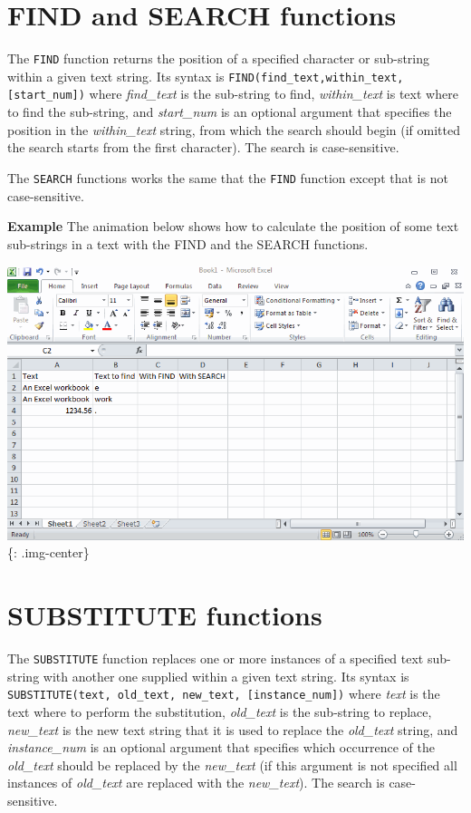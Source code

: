 \section{FIND and SEARCH functions}
\label{findandsearchfunctions}

The \texttt{FIND} function returns the position of a specified character or sub-string within a given text string. Its syntax is \texttt{FIND(find\_text,within\_text,[start\_num])} where \emph{find\_text} is the sub-string to find, \emph{within\_text} is text where to find the sub-string, and \emph{start\_num} is an optional argument that specifies the position in the \emph{within\_text} string, from which the search should begin (if omitted the search starts from the first character). The search is case-sensitive. 

The \texttt{SEARCH} functions works the same that the \texttt{FIND} function except that is not case-sensitive. 

\textbf{Example} The animation below shows how to calculate the position of some text sub-strings in a text with the FIND and the SEARCH functions.

\includegraphics[keepaspectratio,width=\textwidth,height=0.75\textheight]{img/example_function_find_search.gif}
\{: .img-center\}

\section{SUBSTITUTE functions}
\label{substitutefunctions}

The \texttt{SUBSTITUTE} function replaces one or more instances of a specified text sub-string with another one supplied within a given text string. Its syntax is \texttt{SUBSTITUTE(text, old\_text, new\_text, [instance\_num])} where \emph{text} is the text where to perform the substitution, \emph{old\_text} is the sub-string to replace, \emph{new\_text} is the new text string that it is used to replace the \emph{old\_text} string, and \emph{instance\_num} is an optional argument that specifies which occurrence of the \emph{old\_text} should be replaced by the \emph{new\_text} (if this argument is not specified all instances of \emph{old\_text} are replaced with the \emph{new\_text}). The search is case-sensitive. 

